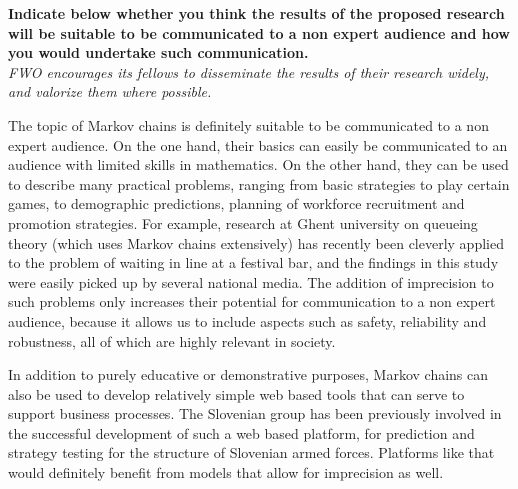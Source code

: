 \documentclass[11pt,dvipsnames,usenames,a4paper]{article}
\begin{document}


\renewcommand\refname{\normalsize Enumerate the bibliographical references that are relevant for your research proposal.}


\vspace{5mm}

\textbf{Indicate below whether you think the results of the proposed research will be suitable to be communicated to a non expert audience and how you would undertake such communication.}\\
\textit{FWO encourages its fellows to disseminate the results of their research widely, and valorize them where possible.}

The topic of Markov chains is definitely suitable to be communicated to a non expert audience. On the one hand, their basics can easily be communicated to an audience with limited skills in mathematics. On the other hand, they can be used to describe many practical problems, ranging from basic strategies to play certain games, to demographic predictions, planning of workforce recruitment and promotion strategies. For example, research at Ghent university on queueing theory (which uses Markov chains extensively) has recently been cleverly applied to the problem of waiting in line at a festival bar, and the findings in this study were easily picked up by several national media.
The addition of imprecision to such problems only increases their potential for communication to a non expert audience, because it allows us to include aspects such as safety, reliability and robustness, all of which are highly relevant in society.

In addition to purely educative or demonstrative purposes, Markov chains can also be used to develop relatively simple web based tools that can serve to support business processes. The Slovenian group has been previously involved in the successful development of such a web based platform, for prediction and strategy testing for the structure of Slovenian armed forces. Platforms like that would definitely benefit from models that allow for imprecision as well.
\end{document}
